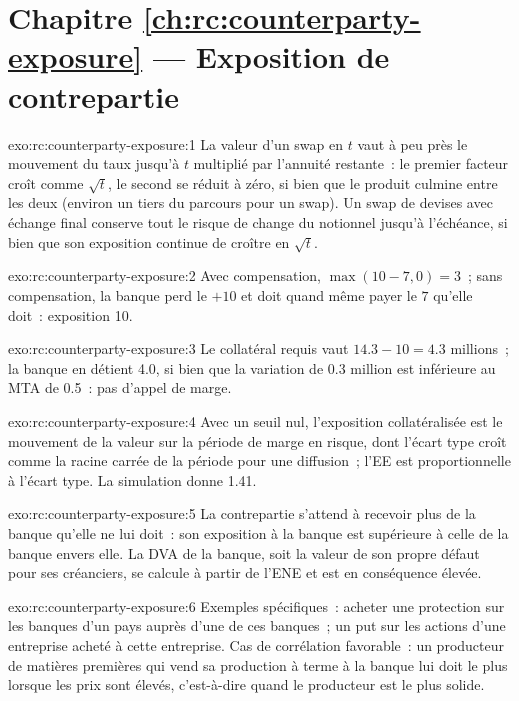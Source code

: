\section*{Chapitre \ref{ch:rc:counterparty-exposure} --- Exposition de contrepartie}

\begin{solution}{exo:rc:counterparty-exposure:1}
La valeur d'un swap en $t$ vaut à peu près le mouvement du taux jusqu'à $t$ multiplié par l'annuité restante~: le premier
facteur croît comme $\sqrt t$, le second se réduit à zéro, si bien que le produit culmine entre les deux (environ un
tiers du parcours pour un swap). Un swap de devises avec échange final conserve tout le risque de change du notionnel
jusqu'à l'échéance, si bien que son exposition continue de croître en $\sqrt t$.
\end{solution}

\begin{solution}{exo:rc:counterparty-exposure:2}
Avec compensation, $\max(10-7,0) = 3$~; sans compensation, la banque perd le $+10$ et doit quand même payer le
$7$ qu'elle doit~: exposition 10.
\end{solution}

\begin{solution}{exo:rc:counterparty-exposure:3}
Le collatéral requis vaut $14.3-10 = 4.3$ millions~; la banque en détient 4.0, si bien que la variation
de 0.3 million est inférieure au MTA de 0.5~: pas d'appel de marge.
\end{solution}

\begin{solution}{exo:rc:counterparty-exposure:4}
Avec un seuil nul, l'exposition collatéralisée est le mouvement de la valeur sur la période de marge
en risque, dont l'écart type croît comme la racine carrée de la période pour une diffusion~;
l'EE est proportionnelle à l'écart type. La simulation donne 1.41.
\end{solution}

\begin{solution}{exo:rc:counterparty-exposure:5}
La contrepartie s'attend à recevoir plus de la banque qu'elle ne lui doit~: son exposition à la banque
est supérieure à celle de la banque envers elle. La DVA de la banque, soit la valeur de son propre défaut
pour ses créanciers, se calcule à partir de l'ENE et est en conséquence élevée.
\end{solution}

\begin{solution}{exo:rc:counterparty-exposure:6}
Exemples spécifiques~: acheter une protection sur les banques d'un pays auprès d'une de ces banques~; un put sur
les actions d'une entreprise acheté à cette entreprise. Cas de corrélation favorable~: un producteur de matières premières qui vend sa
production à terme à la banque lui doit le plus lorsque les prix sont élevés, c'est-à-dire quand le
producteur est le plus solide.
\end{solution}

